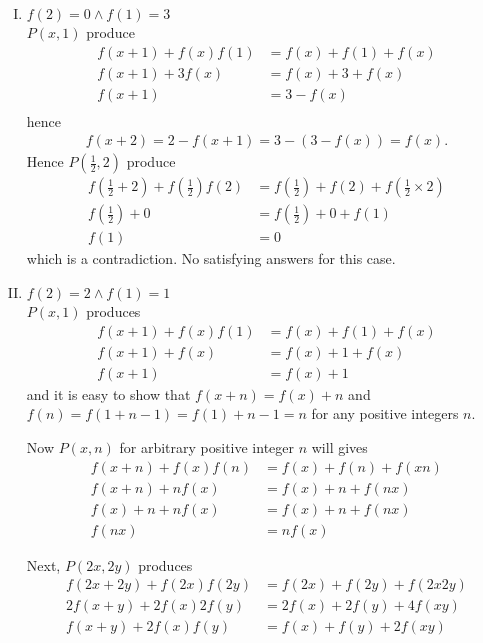 \begin{solusi}
\begin{enumerate}[I.]
        \item $f(2)=0 \wedge f(1)=3$\\
        $P(x,1)$ produce
        \begin{align*}
            f(x+1)+f(x)f(1) &= f(x)+f(1)+f(x)\\
            f(x+1)+3f(x) &= f(x)+3+f(x)\\
            f(x+1) &= 3-f(x)\\
        \end{align*}
        hence 
        \begin{align*}
            f(x+2) = 2 - f(x+1) = 3-(3-f(x)) = f(x).
        \end{align*}
        Hence $P(\frac{1}{2}, 2)$ produce
        \begin{align*}
            f(\frac{1}{2}+2) + f(\frac{1}{2})f(2) &= f(\frac{1}{2})+f(2)+f(\frac{1}{2}\times2)\\
            f(\frac{1}{2}) + 0 &= f(\frac{1}{2}) + 0 +f(1)\\
            f(1) &= 0
        \end{align*}
        which is a contradiction. No satisfying answers for this case.
        
        \item $f(2)=2 \wedge f(1)=1$\\
        $P(x,1)$ produces
        \begin{align*}
            f(x+1)+f(x)f(1) &= f(x)+f(1)+f(x)\\
            f(x+1)+f(x) &= f(x)+1+f(x)\\
            f(x+1) &= f(x) + 1
        \end{align*}
        and it is easy to show that $f(x+n)=f(x)+n$ and $f(n)=f(1+n-1)=f(1)+n-1=n$ for any positive integers $n$.

        Now $P(x,n)$ for arbitrary positive integer $n$ will gives
        \begin{align*}
            f(x+n)+f(x)f(n) &= f(x)+f(n)+f(xn)\\
            f(x+n)+nf(x) &= f(x)+n+f(nx)\\
            f(x)+n+nf(x) &= f(x)+n+f(nx)\\
            f(nx) &= nf(x)
        \end{align*}

        Next, $P(2x,2y)$ produces
        \begin{align*}
            f(2x+2y)+f(2x)f(2y) &= f(2x)+f(2y)+f(2x2y)\\
            2f(x+y)+2f(x)2f(y) &= 2f(x)+2f(y)+4f(xy)\\
            f(x+y)+2f(x)f(y) &= f(x)+f(y)+2f(xy)
        \end{align*}


\end{enumerate}
\end{solusi}
